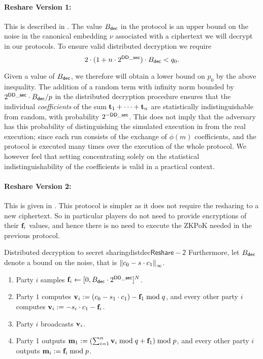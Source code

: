\paragraph{Reshare Version 1:}
This is described in .
The value $B_{\mathsf{dec}}$ in the protocol is an upper bound on the noise in the canonical embedding
$\nu$ associated with a ciphertext we will decrypt in our protocols.
To ensure valid distributed decryption we require
\[ 2 \cdot (1+n \cdot 2^{\mathsf{DD\_sec}}) \cdot B_{\mathsf{dec}} < q_{0}. \]

Given a value of $B_{\mathsf{dec}}$, we therefore will obtain a lower bound
on $p_0$ by the above inequality.
The addition of a random term with infinity norm bounded by
$2^{\mathsf{DD\_sec}} \cdot B_{\mathsf{dec}}/p$ in the distributed decryption procedure
ensures that the individual {\em coefficients} of the sum
$\mathbf{t}_1+\cdots+\mathbf{t}_n$ are statistically indistinguishable from
random, with probability $2^{-\mathsf{DD\_sec}}$.
This does not imply that the adversary has this probability of
distinguishing the simulated execution in \cite{SPDZ} from the
real execution; since each run consists of the exchange of 
$\phi(m)$ coefficients, and the protocol is executed many times
over the execution of the whole protocol.
We however feel that setting concentrating solely on the
statistical indistinguishability of the coefficients is valid 
in a practical context.

\paragraph{Reshare Version 2:}
This is given in .
This protocol is simpler as it does not require the resharing to a 
new ciphertext.
So in particular players do not need to provide encryptions of
their $\mathbf{f}_i$ values, and hence there is no need
to execute the ZKPoK needed in the previous protocol.

\begin{Boxfig}{Distributed decryption to secret
    sharing}{distdec}{$\mathsf{Reshare-2}$}
Furthermore, let $B_{\mathsf{dec}}$ denote a bound on the noise, that is ${\Vert c_0 - s \cdot c_1 \Vert}_\infty$.
\begin{enumerate}
\item Party $i$ samples $\mathbf{f}_i \leftarrow [0,B_{\mathsf{dec}} \cdot 2^{\mathsf{DD\_sec}}]^N$.
\item Party $1$ computes
  $\mathbf{v}_i := (c_0 - s_1 \cdot c_1) - \mathbf{f}_1 \bmod q$, and every other
  party $i$ computes $\mathbf{v}_i :=  -s_i \cdot c_1- \mathbf{f}_i$.
\item Party $i$ broadcasts $\mathbf{v}_i$.
\item Party 1 outputs
  $\mathbf{m}_1 := (\sum_{i=1}^n \mathbf{v}_i \bmod q + \mathbf{f}_1) \bmod p$, and
  every other party $i$ outputs $\mathbf{m}_i := \mathbf{f}_i \bmod p$.
\end{enumerate}
\end{Boxfig}





